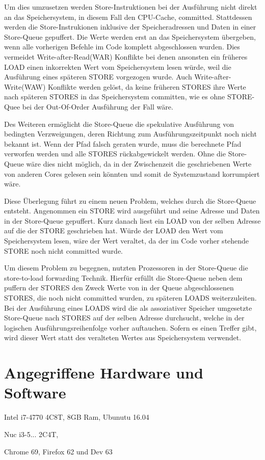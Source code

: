 Um dies umzusetzen werden Store-Instruktionen bei der Ausführung nicht direkt an das Speichersystem, in diesem Fall den CPU-Cache, committed.
Stattdessen werden die Store-Instrukionen inklusive der Speicheradressen und Daten in einer Store-Queue gepuffert.
Die Werte werden erst an das Speichersystem übergeben, wenn alle vorherigen Befehle im Code komplett abgeschlossen wurden.
Dies vermeidet Write-after-Read(WAR) Konflikte bei denen ansonsten ein früheres LOAD einen inkorrekten Wert vom Speichersystem lesen würde, weil die Ausführung eines späteren STORE vorgezogen wurde.
Auch Write-after-Write(WAW) Konflikte werden gelöst, da keine früheren STORES ihre Werte nach späteren STORES in das Speichersystem committen, wie es ohne STORE-Quee bei der Out-Of-Order Ausführung der Fall wäre. 

Des Weiteren ermöglicht die Store-Queue die spekulative Ausführung von bedingten Verzweigungen, deren Richtung zum Ausführungszeitpunkt noch nicht bekannt ist.
Wenn der Pfad falsch geraten wurde, muss die berechnete Pfad verworfen werden und alle STORES rückabgewickelt werden.
Ohne die Store-Queue wäre dies nicht möglich, da in der Zwischenzeit die geschriebenen Werte von anderen Cores gelesen sein könnten und somit de Systemzustand korrumpiert wäre.

Diese Überlegung führt zu einem neuen Problem, welches durch die Store-Queue entsteht.
Angenommen ein STORE wird ausgeführt und seine Adresse und Daten in der Store-Queue gepuffert. Kurz danach liest ein LOAD von der selben Adresse auf die der STORE geschrieben hat.
Würde der LOAD den Wert vom Speichersystem lesen, wäre der Wert veraltet, da der im Code vorher stehende STORE noch nicht committed wurde.

Um diesem Problem zu begegnen, nutzten Prozessoren in der Store-Queue die store-to-load forwarding Technik.
Hierfür erfüllt die Store-Queue neben dem puffern der STORES den Zweck Werte von in der Queue abgeschlossenen STORES, die noch nicht committed wurden, zu späteren LOADS weiterzuleiten.
Bei der Ausführung eines LOADS wird die als assoziativer Speicher umgesetzte Store-Queue nach STORES auf der selben Adresse durchsucht, welche in der logischen Ausführungsreihenfolge vorher auftauchen.
Sofern es einen Treffer gibt, wird dieser Wert statt des veralteten Wertes aus Speichersystem verwendet.

\section{Angegriffene Hardware und Software}

Intel i7-4770 4C8T, 8GB Ram, Ubunutu 16.04

Nuc i3-5... 2C4T, 

Chrome 69, Firefox 62 und Dev 63

